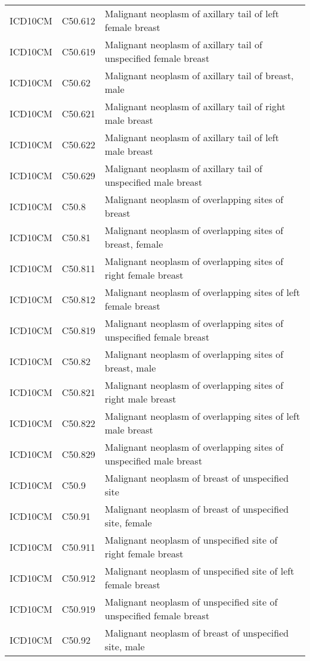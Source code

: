 \begin{longtable}{p{}p{}p{}}
  ICD10CM & C50.612 & Malignant neoplasm of axillary tail of left female breast \\ 
  ICD10CM & C50.619 & Malignant neoplasm of axillary tail of unspecified female breast \\ 
  ICD10CM & C50.62 & Malignant neoplasm of axillary tail of breast, male \\ 
  ICD10CM & C50.621 & Malignant neoplasm of axillary tail of right male breast \\ 
  ICD10CM & C50.622 & Malignant neoplasm of axillary tail of left male breast \\ 
  ICD10CM & C50.629 & Malignant neoplasm of axillary tail of unspecified male breast \\ 
  ICD10CM & C50.8 & Malignant neoplasm of overlapping sites of breast \\ 
  ICD10CM & C50.81 & Malignant neoplasm of overlapping sites of breast, female \\ 
  ICD10CM & C50.811 & Malignant neoplasm of overlapping sites of right female breast \\ 
  ICD10CM & C50.812 & Malignant neoplasm of overlapping sites of left female breast \\ 
  ICD10CM & C50.819 & Malignant neoplasm of overlapping sites of unspecified female breast \\ 
  ICD10CM & C50.82 & Malignant neoplasm of overlapping sites of breast, male \\ 
  ICD10CM & C50.821 & Malignant neoplasm of overlapping sites of right male breast \\ 
  ICD10CM & C50.822 & Malignant neoplasm of overlapping sites of left male breast \\ 
  ICD10CM & C50.829 & Malignant neoplasm of overlapping sites of unspecified male breast \\ 
  ICD10CM & C50.9 & Malignant neoplasm of breast of unspecified site \\ 
  ICD10CM & C50.91 & Malignant neoplasm of breast of unspecified site, female \\ 
  ICD10CM & C50.911 & Malignant neoplasm of unspecified site of right female breast \\ 
  ICD10CM & C50.912 & Malignant neoplasm of unspecified site of left female breast \\ 
  ICD10CM & C50.919 & Malignant neoplasm of unspecified site of unspecified female breast \\ 
  ICD10CM & C50.92 & Malignant neoplasm of breast of unspecified site, male \\ 

\end{longtable}
